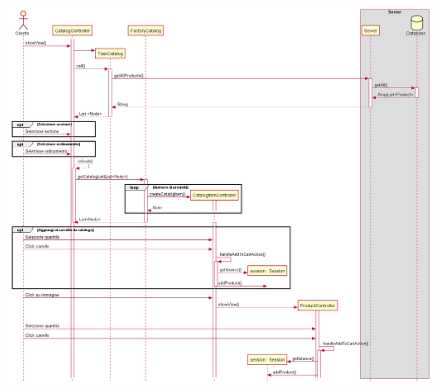 \documentclass[12pt, a4paper]{article}
\begin{document}
\begin{figure}[H]
\centering
\includegraphics[width=\linewidth]{sequence_effettua_spesa.png}

\end{figure}
\end{document}
